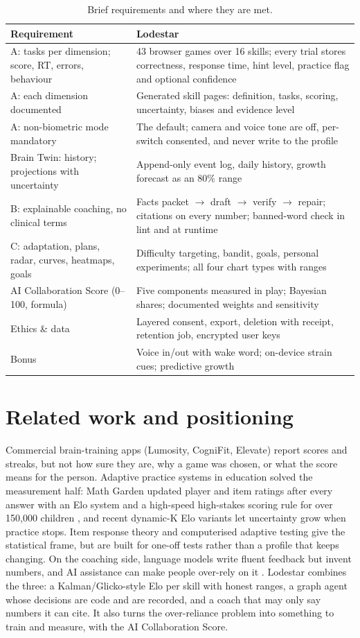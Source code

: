 \documentclass[10pt,a4paper]{article}
\begin{document}
\begin{table}[h]
\centering\small
\begin{tabular}{@{}p{4.2cm}p{12.2cm}@{}}
\toprule
Requirement & Lodestar \\
\midrule
A: tasks per dimension; score, RT, errors, behaviour & 43 browser games over 16 skills; every trial stores correctness, response time, hint level, practice flag and optional confidence \\
A: each dimension documented & Generated skill pages: definition, tasks, scoring, uncertainty, biases and evidence level \\
A: non-biometric mode mandatory & The default; camera and voice tone are off, per-switch consented, and never write to the profile \\
Brain Twin: history; projections with uncertainty & Append-only event log, daily history, growth forecast as an 80\% range \\
B: explainable coaching, no clinical terms & Facts packet $\to$ draft $\to$ verify $\to$ repair; citations on every number; banned-word check in lint and at runtime \\
C: adaptation, plans, radar, curves, heatmaps, goals & Difficulty targeting, bandit, goals, personal experiments; all four chart types with ranges \\
AI Collaboration Score (0--100, formula) & Five components measured in play; Bayesian shares; documented weights and sensitivity \\
Ethics \& data & Layered consent, export, deletion with receipt, retention job, encrypted user keys \\
Bonus & Voice in/out with wake word; on-device strain cues; predictive growth \\
\bottomrule
\end{tabular}
\caption{Brief requirements and where they are met.}\label{tab:map}
\end{table}

\section{Related work and positioning}
Commercial brain-training apps (Lumosity, CogniFit, Elevate) report scores and streaks, but not how
sure they are, why a game was chosen, or what the score means for the person. Adaptive practice
systems in education solved the measurement half: Math Garden updated player and item ratings after
every answer with an Elo system and a high-speed high-stakes scoring rule for over 150{,}000 children
\cite{klinkenberg}, and recent dynamic-K Elo variants let uncertainty grow when practice stops. Item
response theory and computerised adaptive testing give the statistical frame, but are built for
one-off tests rather than a profile that keeps changing. On the coaching side, language models write
fluent feedback but invent numbers, and AI assistance can make people over-rely on it
\cite{bucinca}. Lodestar combines the three: a Kalman/Glicko-style Elo per skill with honest ranges,
a graph agent whose decisions are code and are recorded, and a coach that may only say numbers it can
cite. It also turns the over-reliance problem into something to train and measure, with the AI
Collaboration Score.
\end{document}
